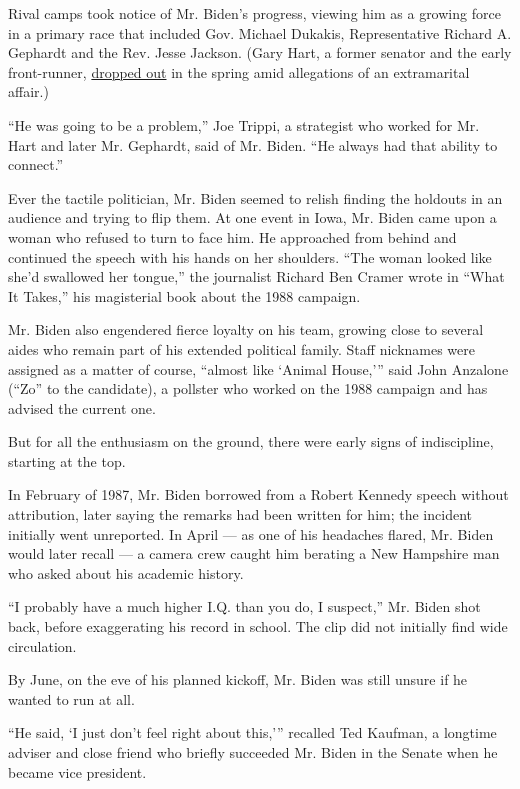 Rival camps took notice of Mr. Biden's progress, viewing him as a
growing force in a primary race that included Gov. Michael Dukakis,
Representative Richard A. Gephardt and the Rev. Jesse Jackson. (Gary
Hart, a former senator and the early front-runner,
\href{https://www.nytimes3xbfgragh.onion/1987/05/09/us/hart-drops-race-for-white-house-in-a-defiant-mood.html}{dropped
out} in the spring amid allegations of an extramarital affair.)

``He was going to be a problem,'' Joe Trippi, a strategist who worked
for Mr. Hart and later Mr. Gephardt, said of Mr. Biden. ``He always had
that ability to connect.''

Ever the tactile politician, Mr. Biden seemed to relish finding the
holdouts in an audience and trying to flip them. At one event in Iowa,
Mr. Biden came upon a woman who refused to turn to face him. He
approached from behind and continued the speech with his hands on her
shoulders. ``The woman looked like she'd swallowed her tongue,'' the
journalist Richard Ben Cramer wrote in ``What It Takes,'' his
magisterial book about the 1988 campaign.

Mr. Biden also engendered fierce loyalty on his team, growing close to
several aides who remain part of his extended political family. Staff
nicknames were assigned as a matter of course, ``almost like `Animal
House,''' said John Anzalone (``Zo'' to the candidate), a pollster who
worked on the 1988 campaign and has advised the current one.

But for all the enthusiasm on the ground, there were early signs of
indiscipline, starting at the top.

In February of 1987, Mr. Biden borrowed from a Robert Kennedy speech
without attribution, later saying the remarks had been written for him;
the incident initially went unreported. In April --- as one of his
headaches flared, Mr. Biden would later recall --- a camera crew caught
him berating a New Hampshire man who asked about his academic history.

``I probably have a much higher I.Q. than you do, I suspect,'' Mr. Biden
shot back, before exaggerating his record in school. The clip did not
initially find wide circulation.

By June, on the eve of his planned kickoff, Mr. Biden was still unsure
if he wanted to run at all.

``He said, `I just don't feel right about this,''' recalled Ted Kaufman,
a longtime adviser and close friend who briefly succeeded Mr. Biden in
the Senate when he became vice president.

